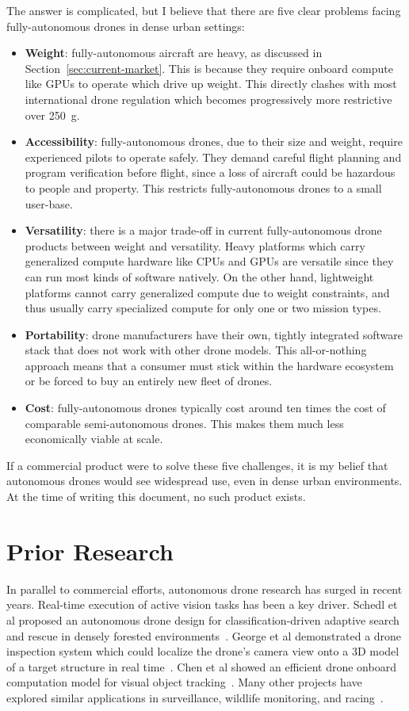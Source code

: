 The answer is complicated, but I believe that there are five clear problems facing fully-autonomous drones in dense urban settings:
\begin{itemize}
    \item \textbf{Weight}: fully-autonomous aircraft are heavy, as discussed in Section~\ref{sec:current-market}. This is because they require onboard compute like GPUs to operate which drive up weight. This directly clashes with most international drone regulation which becomes progressively more restrictive over 250~g.
    \item \textbf{Accessibility}: fully-autonomous drones, due to their size and weight, require experienced pilots to operate safely. They demand careful flight planning and program verification before flight, since a loss of aircraft could be hazardous to people and property. This restricts fully-autonomous drones to a small user-base.
    \item \textbf{Versatility}: there is a major trade-off in current fully-autonomous drone products between weight and versatility. Heavy platforms which carry generalized compute hardware like CPUs and GPUs are versatile since they can run most kinds of software natively. On the other hand, lightweight platforms cannot carry generalized compute due to weight constraints, and thus usually carry specialized compute for only one or two mission types.
    \item \textbf{Portability}: drone manufacturers have their own, tightly integrated software stack that does not work with other drone models. This all-or-nothing approach means that a consumer must stick within the hardware ecosystem or be forced to buy an entirely new fleet of drones.
    \item \textbf{Cost}: fully-autonomous drones typically cost around ten times the cost of comparable semi-autonomous drones. This makes them much less economically viable at scale. 
\end{itemize}
If a commercial product were to solve these five challenges, it is my belief that autonomous drones would see widespread use, even in dense urban environments. At the time of writing this document, no such product exists.

\section{Prior Research}
\label{sec:prior-work}
In parallel to commercial efforts, autonomous drone research has surged in recent years. Real-time execution of active vision tasks has been a key driver. Schedl et al proposed an autonomous drone design for classification-driven adaptive search and rescue in densely forested environments~\cite{Schedl2021}. George et al demonstrated a drone inspection system which could localize the drone's camera view onto a 3D model of a target structure in real time~\cite{George2019}. Chen et al showed an efficient drone onboard computation model for visual object tracking~\cite{Chen2018}. Many other projects have explored similar applications in surveillance, wildlife monitoring, and racing~\cite{Apvrille2014,Li2020,Devos2018,Alsalam2017,Ward2016}.  

